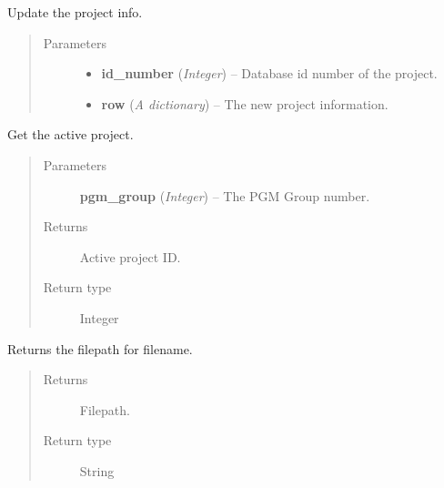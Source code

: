 \documentclass[letterpaper,10pt,english]{sphinxmanual}
\begin{document}

\begin{fulllineitems}
\label{controller:controller.project.edit_project}
Update the project info.
\begin{quote}\begin{description}
\item[{Parameters}] \leavevmode\begin{itemize}
\item {} 
\textbf{id\_number} (\emph{Integer}) -- Database id number of the project.

\item {} 
\textbf{row} (\emph{A dictionary}) -- The new project information.

\end{itemize}

\end{description}\end{quote}

\end{fulllineitems}


\begin{fulllineitems}
\label{controller:controller.project.get_active_project}
Get the active project.
\begin{quote}\begin{description}
\item[{Parameters}] \leavevmode
\textbf{pgm\_group} (\emph{Integer}) -- The PGM Group number.

\item[{Returns}] \leavevmode
Active project ID.

\item[{Return type}] \leavevmode
Integer

\end{description}\end{quote}

\end{fulllineitems}


\begin{fulllineitems}
\label{controller:controller.project.get_file_path}
Returns the filepath for filename.
\begin{quote}\begin{description}
\item[{Returns}] \leavevmode
Filepath.

\item[{Return type}] \leavevmode
String

\end{description}\end{quote}

\end{fulllineitems}
\end{document}

